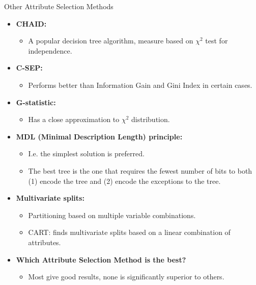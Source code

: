 \begin{frame}{Other Attribute Selection Methods}
	\vspace*{-1em}
	\begin{itemize}
		\item \textbf{CHAID:}
		      \begin{itemize}
			      \item A popular decision tree algorithm, measure based on $\chi^2$ test for independence.
		      \end{itemize}
		\item \textbf{C-SEP:}
		      \begin{itemize}
			      \item Performs better than Information Gain and Gini Index in certain cases.
		      \end{itemize}
		\item \textbf{G-statistic:}
		      \begin{itemize}
			      \item Has a close approximation to $\chi^2$ distribution.
		      \end{itemize}
		\item \textbf{MDL (Minimal Description Length) principle:}
		      \begin{itemize}
			      \item I.e. the simplest solution is preferred.
			      \item The best tree is the one that requires the fewest number of bits to both (1) encode the tree and (2) encode the exceptions to the tree.
		      \end{itemize}
		\item \textbf{Multivariate splits:}
		      \begin{itemize}
			      \item Partitioning based on multiple variable combinations.
			      \item CART: finds multivariate splits based on a linear combination of attributes.
		      \end{itemize}
		\item \textbf{Which Attribute Selection Method is the best?}
		      \begin{itemize}
			      \item Most give good results, none is significantly superior to others.
		      \end{itemize}
	\end{itemize}
\end{frame}


